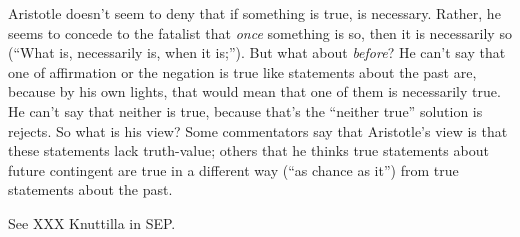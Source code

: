 \documentclass[../../../include/open-logic-section]{subfiles}
\begin{document}
Aristotle doesn't seem to deny that if something is true, is necessary. Rather, he seems to concede to the fatalist that \emph{once} something is so, then it is necessarily so (``What is, necessarily is, when it is;''). But what about \emph{before}? He can't say that one of affirmation or the negation is true like statements about the past are, because by his own lights, that would mean that one of them is necessarily true. He can't say that neither is true, because that's the ``neither true'' solution is rejects. So what is his view? Some commentators say that Aristotle's view is that these statements lack truth-value; others that he thinks true statements about future contingent are true in a different way (``as chance as it'') from true statements about the past. 

See XXX Knuttilla in SEP. 
\end{document}
